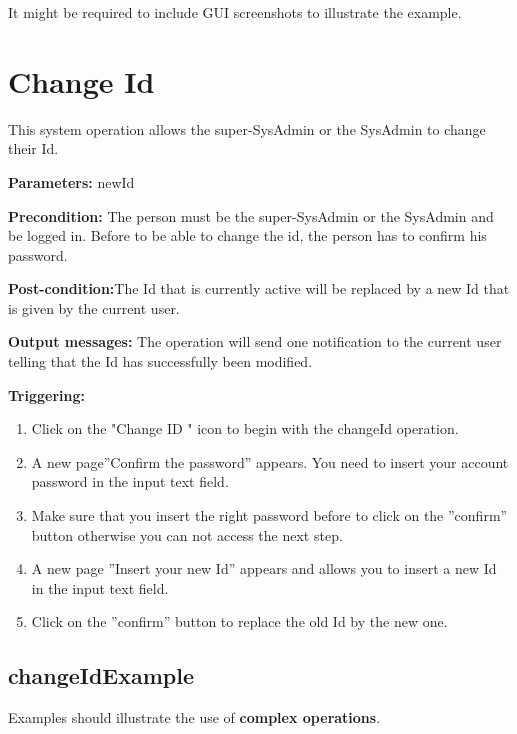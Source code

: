 It might be required to include GUI screenshots to illustrate the example.




\section{Change Id}
\label{operation:changeId}
This system operation allows the super-SysAdmin or the SysAdmin to change
their Id.

\begin{description}

\item \textbf{Parameters:} newId
\item \textbf{Precondition:} The person must be the super-SysAdmin or the
SysAdmin and be logged in. Before to be able to change the id, the person has to
confirm his password.
\item \textbf{Post-condition:}The Id that is currently active will be
replaced by a new Id that is given by the current user.
\item \textbf{Output messages:} The operation will send one notification to the
current user telling that the Id  has successfully been modified.


\item \textbf{Triggering:}
\begin{enumerate}
\item Click on the "Change ID " icon to begin with the changeId operation. 
\item A new page''Confirm the password'' appears. You need to insert your
account password in the input text field. 
\item Make sure that you insert the right password before to click on the
''confirm'' button otherwise you can not access the next step.
\item A new page ''Insert your new Id'' appears and allows you to
insert a new Id in the input text field.
\item Click on the ''confirm'' button to replace the old Id by the new one.

\end{enumerate}

 
\end{description}

 
\subsection{changeIdExample}
Examples should illustrate the use of \textbf{complex operations}.

